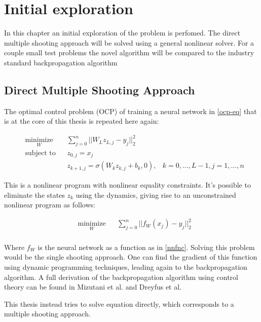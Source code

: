\chapter{Initial exploration}
\label{cha:1}
In this chapter an initial exploration of the problem is perfomed. The direct multiple shooting approach will be solved using a general nonlinear solver. For a couple small test problems the novel algorithm will be compared to the industry standard backpropagation algorithm

\section{Direct Multiple Shooting Approach}
The optimal control problem (OCP) of training a neural network in \ref{ocp-eq} that is at the core of this thesis is repeated here again:

\begin{equation}
	\begin{aligned}
	& \underset{W}{\text{minimize}}
	& & \sum\limits_{j=0}^{n}||W_Lz_{L,j} - y_j||^2_2 \\
	& \text{subject to}
	& & z_{0,j} = x_j \\
	& & & z_{k+1,j} = \sigma(W_kz_{k,j} + b_k,0), &k = 0,\ldots,L-1,j = 1,\ldots,n
	\end{aligned}
	\label{ocp-eq2}
\end{equation}

This is a nonlinear program with nonlinear equality constraints. It's possible to eliminate the states $z_k$ using the dynamics, giving rise to an unconstrained nonlinear program as follows:

\begin{equation}
	\begin{aligned}
	& \underset{W}{\text{minimize}}
	& & \sum\limits_{j=0}^{n}||f_W(x_j) - y_j||^2_2 \\
	\end{aligned}
\end{equation}

Where $f_W$ is the neural network as a function as in \ref{nnfnc}. Solving this problem would be the single shooting approach. One can find the gradient of this function using dynamic programming techniques, leading again to the backpropagation algorithm. A full derivation of the backpropagation algorithm using control theory can be found in Mizutani et al. \cite{mizutani2000} and Dreyfus et al. \cite{dreyfus1990}

This thesis instead tries to solve equation \label{ocp-eq2} directly, which corresponds to a multiple shooting approach.

